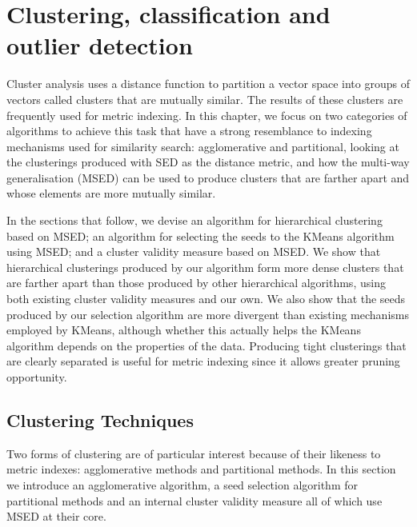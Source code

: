 \chapter{Clustering, classification and outlier detection}\label{ch:clustering_classification_and_outlier_detection}
Cluster analysis uses a distance function to partition a vector space into groups of vectors called clusters that are mutually similar. The results of these clusters are frequently used for metric indexing.  In this chapter, we focus on two categories of algorithms to achieve this task that have a strong resemblance to indexing mechanisms used for similarity search:  agglomerative and partitional, looking at the clusterings produced with SED as the distance metric, and how the multi-way generalisation (MSED) can be used to produce clusters that are farther apart and whose elements are more mutually similar.

In the sections that follow, we devise an algorithm for hierarchical clustering based on MSED; an algorithm for selecting the seeds to the KMeans algorithm using MSED; and a cluster validity measure based on MSED.  
We show that hierarchical clusterings produced by our algorithm form more dense clusters that are farther apart than those produced by other hierarchical algorithms, using both existing cluster validity measures and our own.  
We also show that the seeds produced by our selection algorithm are more divergent than existing mechanisms employed by KMeans, although whether this actually helps the KMeans algorithm depends on the properties of the data.  Producing tight clusterings that are clearly separated is useful for metric indexing since it allows greater pruning opportunity.
\section{Clustering Techniques}
Two forms of clustering are of particular interest because of their likeness to metric indexes: agglomerative methods and partitional methods.  In this section we introduce an agglomerative algorithm, a seed selection algorithm for partitional methods and an internal cluster validity measure all of which use MSED at their core.
